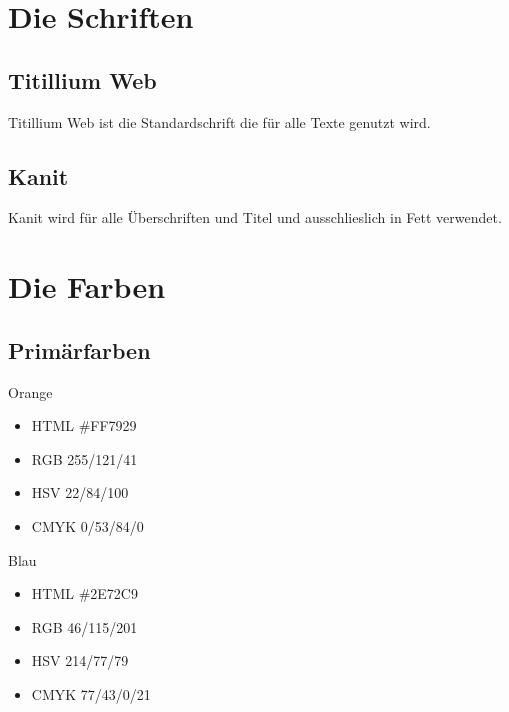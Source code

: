 \documentclass{article}
\begin{document}
\section{Die Schriften}

\begin{samepage}
\subsection{Titillium Web}

Titillium Web ist die Standardschrift die für alle Texte genutzt wird.
\end{samepage}

\subsection{Kanit}
\begin{samepage}

Kanit wird für alle Überschriften und Titel und ausschlieslich in Fett verwendet.
\end{samepage}

\section{Die Farben}

\subsection{Primärfarben}
\begin{samepage}
\cfield[LESOrange]
Orange
\begin{itemize}
\item HTML \#FF7929
\item RGB 255/121/41
\item HSV 22/84/100
\item CMYK 0/53/84/0
\end{itemize}
\end{samepage}

\begin{samepage}
\cfield[LESBlue]
Blau
\begin{itemize}
\item HTML \#2E72C9
\item RGB 46/115/201
\item HSV 214/77/79
\item CMYK 77/43/0/21
\end{itemize}
\end{samepage}
\end{document}
